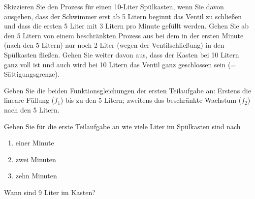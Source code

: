 \begin{bbwAufgabenBlock}
\item Skizzieren Sie den Prozess für einen 10-Liter Spülkasten, wenn
  Sie davon ausgehen, dass der Schwimmer erst ab 5 Litern beginnt das
  Ventil zu schließen und dass die ersten 5 Liter mit 3 Litern pro
  Minute gefüllt werden.
  Gehen Sie ab den 5 Litern von einem beschränkten Prozess aus bei dem
  in der ersten Minute (nach den 5 Litern) nur noch 2 Liter (wegen
  der Ventilschließung) in den Spülkasten fließen. Gehen Sie weiter
  davon aus, dass der Kasten bei 10 Litern ganz voll ist und auch wird
  bei 10 Litern das Ventil ganz geschlossen sein (= Sättigungsgrenze).
  
\item Geben Sie die beiden Funktionsgleichungen der ersten Teilaufgabe
  an: Erstens die
  lineare Füllung ($f_1$) bis zu den 5 Litern; zweitens das beschränkte
  Wachstum ($f_2$) nach den 5 Litern.
  
  
\item Geben Sie für die erste Teilaufgabe an wie viele Liter im
  Spülkasten sind nach
  \begin{enumerate}
    \item einer Minute 
    \item zwei Minuten 
    \item zehn Minuten 
  \end{enumerate}

\item Wann sind 9 Liter im Kasten?
  
\end{bbwAufgabenBlock}

